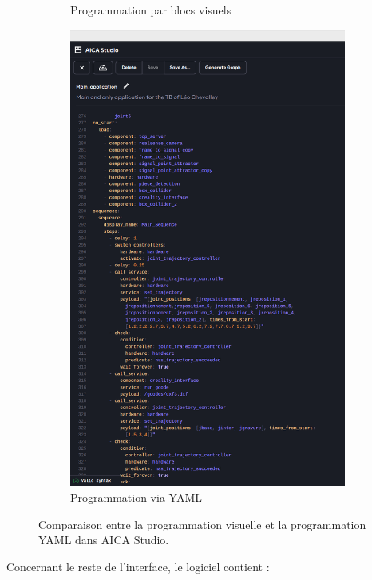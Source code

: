 \begin{figure}[H]
\begin{subfigure}{0.48\textwidth}
        \caption{Programmation par blocs visuels}
        \label{fig:prog_blocs_visuels}
    \end{subfigure}
    \hfill
    \begin{subfigure}{0.48\textwidth}
        \centering
        \includegraphics[width=0.95\linewidth]{assets/figures/AICA_Yaml.png}
        \caption{Programmation via YAML}
        \label{fig:prog_yaml}
    \end{subfigure}
    \caption{Comparaison entre la programmation visuelle et la programmation YAML dans AICA Studio.}
    \label{fig:comparaison_yaml_visuel}
\end{figure}

Concernant le reste de l'interface, le logiciel contient :

